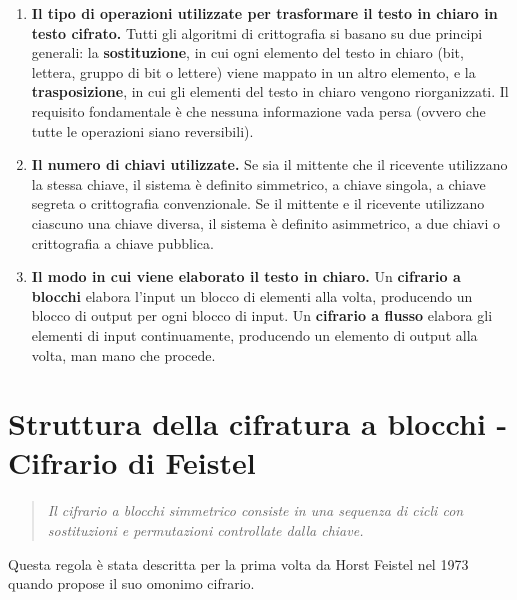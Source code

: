 \documentclass{article}
\begin{document}
\begin{enumerate}
    \item \textbf{Il tipo di operazioni utilizzate per trasformare il testo in chiaro in testo cifrato.} Tutti gli algoritmi di crittografia si basano su due principi generali: la \textbf{sostituzione}, in cui ogni elemento del testo in chiaro (bit, lettera, gruppo di bit o lettere) viene mappato in un altro elemento, e la \textbf{trasposizione}, in cui gli elementi del testo in chiaro vengono riorganizzati. Il requisito fondamentale è che nessuna informazione vada persa (ovvero che tutte le operazioni siano reversibili).
    \item \textbf{Il numero di chiavi utilizzate.} Se sia il mittente che il ricevente utilizzano la stessa chiave, il sistema è definito simmetrico, a chiave singola, a chiave segreta o crittografia convenzionale. Se il mittente e il ricevente utilizzano ciascuno una chiave diversa, il sistema è definito asimmetrico, a due chiavi o crittografia a chiave pubblica.
    \item \textbf{Il modo in cui viene elaborato il testo in chiaro.} Un \textbf{cifrario a blocchi} elabora l'input un blocco di elementi alla volta, producendo un blocco di output per ogni blocco di input. Un \textbf{cifrario a flusso} elabora gli elementi di input continuamente, producendo un elemento di output alla volta, man mano che procede.
\end{enumerate}

\vspace{0.8cm}

\section*{Struttura della cifratura a blocchi - Cifrario di Feistel}

\begin{quote}
    \textit{Il cifrario a blocchi simmetrico consiste in una sequenza di cicli con sostituzioni e permutazioni controllate dalla chiave.}
\end{quote}

\noindent Questa regola è stata descritta per la prima volta da Horst Feistel nel 1973 quando propose il suo omonimo cifrario.

\vspace{0.5cm}
\end{document}
